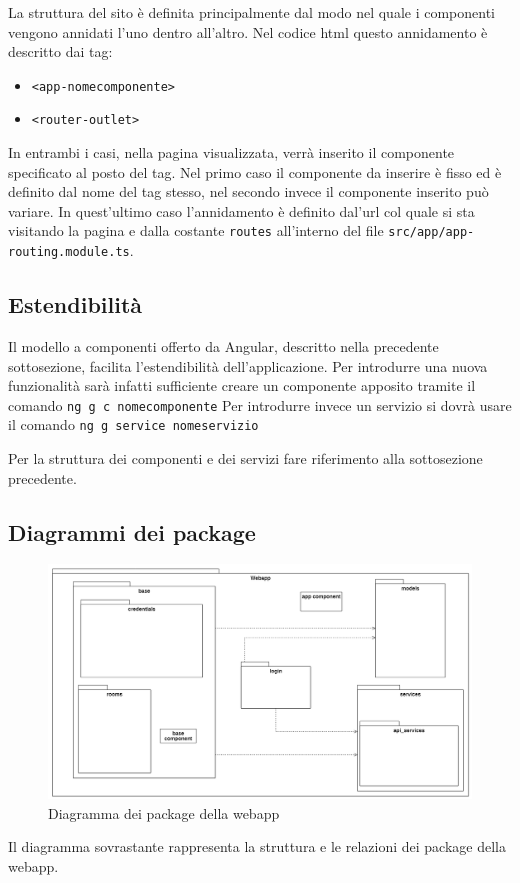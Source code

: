 La struttura del sito è definita principalmente dal modo nel quale i componenti vengono annidati l'uno dentro all'altro. Nel codice html questo annidamento è descritto dai tag:
\begin{itemize}
	\item \texttt{<app-nomecomponente>}
	\item \texttt{<router-outlet>}
\end{itemize}
In entrambi i casi, nella pagina visualizzata, verrà inserito il componente specificato al posto del tag. Nel primo caso il componente da inserire è fisso ed è definito dal nome del tag stesso, nel secondo invece il componente inserito può variare. In quest'ultimo caso l'annidamento è definito dal'url col quale si sta visitando la pagina e dalla costante \texttt{routes} all'interno del file \texttt{src/app/app-routing.module.ts}.

\subsection{Estendibilità}
Il modello a componenti offerto da Angular, descritto nella precedente sottosezione, facilita l'estendibilità dell'applicazione. Per introdurre una nuova funzionalità sarà infatti sufficiente creare un componente apposito tramite il comando \newline
	\texttt{ng g c nomecomponente} \newline
Per introdurre invece un servizio si dovrà usare il comando \newline
	\texttt{ng g service nomeservizio} \newline

Per la struttura dei componenti e dei servizi fare riferimento alla sottosezione precedente.

\subsection{Diagrammi dei package}
\begin{figure}[H]
	\centering
	\includegraphics[width=18cm]{res/images/webapp-totale-diagrammaPackage.png}
	\caption{Diagramma dei package della webapp}
	\label{fig:DiagrammaPackageWebapp}
\end{figure}
Il diagramma sovrastante rappresenta la struttura e le relazioni dei package della webapp.

